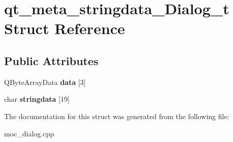 \hypertarget{structqt__meta__stringdata__Dialog__t}{\section{qt\-\_\-meta\-\_\-stringdata\-\_\-\-Dialog\-\_\-t Struct Reference}
\label{structqt__meta__stringdata__Dialog__t}
}
\subsection*{Public Attributes}
\begin{DoxyCompactItemize}
\item 
\hypertarget{structqt__meta__stringdata__Dialog__t_a4981086229b25797c939ebe1e0518086}{Q\-Byte\-Array\-Data {\bfseries data} \mbox{[}3\mbox{]}}\label{structqt__meta__stringdata__Dialog__t_a4981086229b25797c939ebe1e0518086}

\item 
\hypertarget{structqt__meta__stringdata__Dialog__t_afa08e36ceb96e286d9135b57b5c8bf8d}{char {\bfseries stringdata} \mbox{[}19\mbox{]}}\label{structqt__meta__stringdata__Dialog__t_afa08e36ceb96e286d9135b57b5c8bf8d}

\end{DoxyCompactItemize}


The documentation for this struct was generated from the following file\-:\begin{DoxyCompactItemize}
\item 
moc\-\_\-dialog.\-cpp\end{DoxyCompactItemize}
